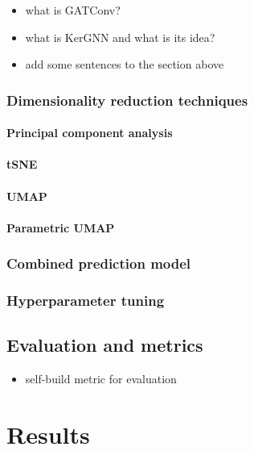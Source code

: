 \documentclass[]{article}
\begin{document}
\begin{itemize}
	\item what is GATConv?
	\item what is KerGNN and what is its idea?
	\item add some sentences to the section above
\end{itemize}

\subsubsection{Dimensionality reduction techniques}
\paragraph{Principal component analysis}

\paragraph{tSNE}

\paragraph{UMAP}

\paragraph{Parametric UMAP}

\subsubsection{Combined prediction model}

\subsubsection{Hyperparameter tuning}

\subsection{Evaluation and metrics}
\begin{itemize}
	\item self-build metric for evaluation
\end{itemize}


\newpage
\section{Results}
\label{sec:results}
\end{document}
